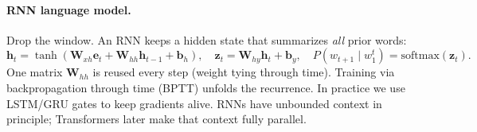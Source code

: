 \paragraph{RNN language model.} Drop the window. An RNN keeps a hidden state that summarizes \emph{all} prior words:
\begin{equation}
\mathbf{h}_{t}=\tanh(\mathbf{W}_{xh}\mathbf{e}_{t}+\mathbf{W}_{hh}\mathbf{h}_{t-1}+\mathbf{b}_{h}),\quad
\mathbf{z}_{t}=\mathbf{W}_{hy}\mathbf{h}_{t}+\mathbf{b}_{y},\quad
P(w_{t+1}\mid w_{1}^{t})=\text{softmax}(\mathbf{z}_{t}).
\label{eq:rnn-lm}
\end{equation}
One matrix $\mathbf{W}_{hh}$ is reused every step (weight tying through time). Training via backpropagation through time (BPTT) unfolds the recurrence. In practice we use LSTM/GRU gates to keep gradients alive. RNNs have unbounded context in principle; Transformers later make that context fully parallel.
